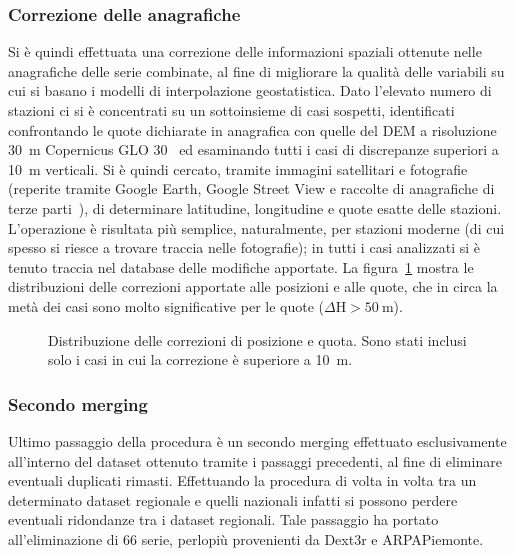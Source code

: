 \subsubsection{Correzione delle anagrafiche}
Si è quindi effettuata una correzione delle informazioni spaziali ottenute nelle anagrafiche delle serie combinate, al fine di migliorare la qualità delle variabili su cui si basano i modelli di interpolazione geostatistica. Dato l'elevato numero di stazioni ci si è concentrati su un sottoinsieme di casi sospetti, identificati confrontando le quote dichiarate in anagrafica con quelle del DEM a risoluzione \qty{30}{\meter} Copernicus GLO 30~\cite{europeanspaceagencyCopernicusGlobalEuropean2022} ed esaminando tutti i casi di discrepanze superiori a \qty{10}{\meter} verticali. Si è quindi cercato, tramite immagini satellitari e fotografie (reperite tramite Google Earth, Google Street View e raccolte di anagrafiche di terze parti~\cite{associazionelineameteoStazioniReteLinea}), di determinare latitudine, longitudine e quote esatte delle stazioni. L'operazione è risultata più semplice, naturalmente, per stazioni moderne (di cui spesso si riesce a trovare traccia nelle fotografie); in tutti i casi analizzati si è tenuto traccia nel database delle modifiche apportate. La figura~\ref{fig:corrections-deltas} mostra le distribuzioni delle correzioni apportate alle posizioni e alle quote, che in circa la metà dei casi sono molto significative per le quote (\(\Delta \mathrm{H} > \qty{50}{\meter}\)).

\begin{figure}[ht]
  \centering
  
  \caption{Distribuzione delle correzioni di posizione e quota. Sono stati inclusi solo i casi in cui la correzione è superiore a \qty{10}{\meter}.}\label{fig:corrections-deltas}
\end{figure}

\subsubsection{Secondo merging}
Ultimo passaggio della procedura è un secondo merging effettuato esclusivamente all'interno del dataset ottenuto tramite i passaggi precedenti, al fine di eliminare eventuali duplicati rimasti. Effettuando la procedura di volta in volta tra un determinato dataset regionale e quelli nazionali infatti si possono perdere eventuali ridondanze tra i dataset regionali. Tale passaggio ha portato all'eliminazione di 66 serie, perlopiù provenienti da Dext3r e ARPAPiemonte.

